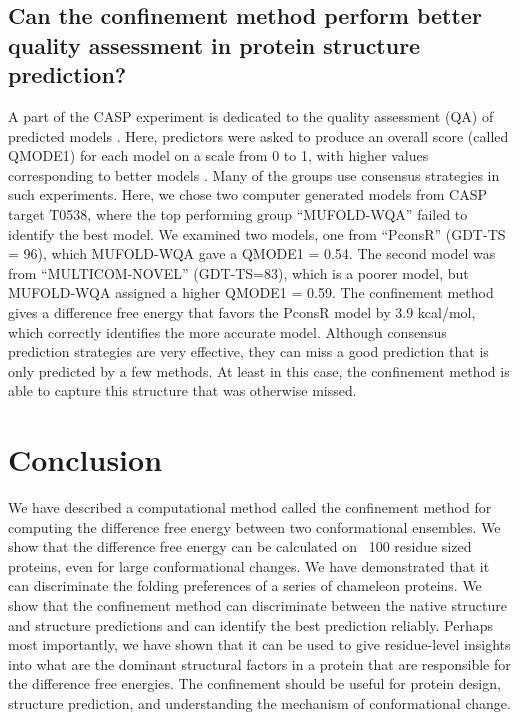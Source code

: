 \documentclass[12pt]{article}
\begin{document}
\subsection*{Can the confinement method perform better quality assessment in protein structure prediction?}

A part of the CASP experiment is dedicated to the quality assessment (QA) of predicted models \cite{Kryshtafovych2011}.
Here, predictors were asked to produce an overall score (called QMODE1) for each model on a scale from 0 to 1, with
higher values corresponding to better models \cite{Kryshtafovych2011}. Many of the groups use consensus strategies in
such experiments. Here, we chose two computer generated models from CASP target T0538, where the top performing group
``MUFOLD-WQA'' \cite{Wang2011} failed to identify the best model. We examined two models, one from ``PconsR'' (GDT-TS =
96), which MUFOLD-WQA gave a QMODE1 = 0.54. The second model was from ``MULTICOM-NOVEL'' (GDT-TS=83), which is a poorer
model, but MUFOLD-WQA assigned a higher QMODE1 = 0.59. The confinement method gives a difference free energy that favors
the PconsR model by 3.9 kcal/mol, which correctly identifies the more accurate model. Although consensus prediction
strategies are very effective, they can miss a good prediction that is only predicted by a few methods. At least in this
case, the confinement method is able to capture this structure that was otherwise missed.

\section*{Conclusion}

We have described a computational method called the confinement method for computing the difference free energy between
two conformational ensembles. We show that the difference free energy can be calculated on ~100 residue sized proteins,
even for large conformational changes. We have demonstrated that it can discriminate the folding preferences of a series
of chameleon proteins. We show that the confinement method can discriminate between the native structure and structure
predictions and can identify the best prediction reliably. Perhaps most importantly, we have shown that it can be used
to give residue-level insights into what are the dominant structural factors in a protein that are responsible for the
difference free energies. The confinement should be useful for protein design, structure prediction, and understanding
the mechanism of conformational change.
\end{document}
